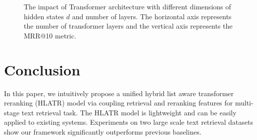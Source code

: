 \documentclass[11pt]{article}
\begin{document}
\begin{figure}[h]
    \centering
    \caption{The impact of Transformer architecture with different dimensions of hidden states $d$ and number of layers. The horizontal axis represents the number of transformer layers and the vertical axis represents the MRR@10 metric.}
    \label{fig:analysis}
\end{figure}

\section{Conclusion}
In this paper, we intuitively propose a unified hybrid list aware transformer reranking (HLATR) model via coupling retrieval and reranking features for multi-stage text retrieval task. The HLATR model is lightweight and can be easily applied to existing systems. Experiments on two large scale text retrieval datasets show our framework significantly outperforms previous baselines. 


\end{document}
